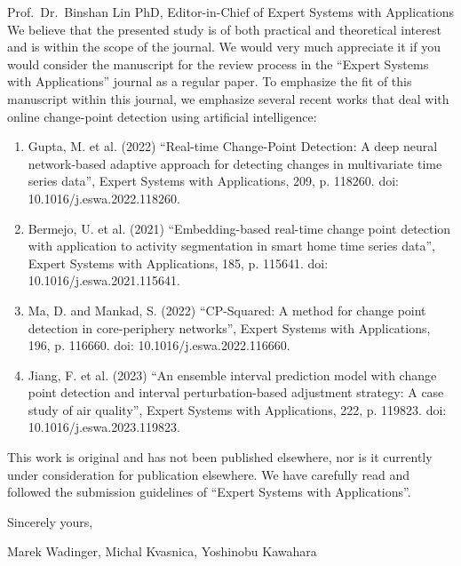 \documentclass{letter}
\begin{document}
\begin{letter}{Prof.~Dr.~Binshan Lin PhD, Editor-in-Chief of Expert Systems with Applications}
    We believe that the presented study is of both practical and theoretical interest and is within the scope of the journal. We would very much appreciate it if you would consider the manuscript for the review process in the ``Expert Systems with Applications'' journal as a regular paper. To emphasize the fit of this manuscript within this journal, we emphasize several recent works that deal with online change-point detection using artificial intelligence:
    \begin{enumerate}
        \item Gupta, M. et al. (2022) ``Real-time Change-Point Detection: A deep neural network-based adaptive approach for detecting changes in multivariate time series data'', Expert Systems with Applications, 209, p. 118260. doi: 10.1016/j.eswa.2022.118260.
        \item Bermejo, U. et al. (2021) ``Embedding-based real-time change point detection with application to activity segmentation in smart home time series data'', Expert Systems with Applications, 185, p. 115641. doi: 10.1016/j.eswa.2021.115641.
        \item Ma, D. and Mankad, S. (2022) ``CP-Squared: A method for change point detection in core-periphery networks'', Expert Systems with Applications, 196, p. 116660. doi: 10.1016/j.eswa.2022.116660.
        \item Jiang, F. et al. (2023) ``An ensemble interval prediction model with change point detection and interval perturbation-based adjustment strategy: A case study of air quality'', Expert Systems with Applications, 222, p. 119823. doi: 10.1016/j.eswa.2023.119823.
    \end{enumerate}

    This work is original and has not been published elsewhere, nor is it currently under consideration for publication elsewhere. We have carefully read and followed the submission guidelines of ``Expert Systems with Applications''.

    Sincerely yours,

    Marek Wadinger, Michal Kvasnica, Yoshinobu Kawahara

\end{letter}
\end{document}

